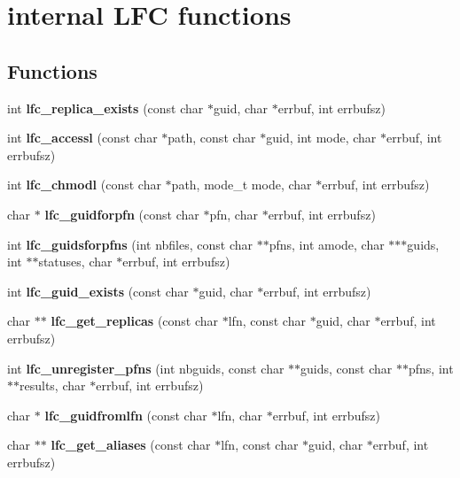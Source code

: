 \section{internal LFC functions}
\label{group__lfc__low__group}
\subsection*{Functions}
\begin{DoxyCompactItemize}
\item 
int {\bfseries lfc\_\-replica\_\-exists} (const char $\ast$guid, char $\ast$errbuf, int errbufsz)\label{group__lfc__low__group_gabbe18c87850e75add8cb0d61990ee0e1}

\item 
int {\bfseries lfc\_\-accessl} (const char $\ast$path, const char $\ast$guid, int mode, char $\ast$errbuf, int errbufsz)\label{group__lfc__low__group_gad7d35d7f3896696a7279ef8021df3673}

\item 
int {\bfseries lfc\_\-chmodl} (const char $\ast$path, mode\_\-t mode, char $\ast$errbuf, int errbufsz)\label{group__lfc__low__group_gaee59846916e41529d63b44915f122191}

\item 
char $\ast$ {\bf lfc\_\-guidforpfn} (const char $\ast$pfn, char $\ast$errbuf, int errbufsz)
\item 
int {\bf lfc\_\-guidsforpfns} (int nbfiles, const char $\ast$$\ast$pfns, int amode, char $\ast$$\ast$$\ast$guids, int $\ast$$\ast$statuses, char $\ast$errbuf, int errbufsz)
\item 
int {\bf lfc\_\-guid\_\-exists} (const char $\ast$guid, char $\ast$errbuf, int errbufsz)
\item 
char $\ast$$\ast$ {\bfseries lfc\_\-get\_\-replicas} (const char $\ast$lfn, const char $\ast$guid, char $\ast$errbuf, int errbufsz)\label{group__lfc__low__group_ga3c5ecef79062be724003a2260ef40b19}

\item 
int {\bf lfc\_\-unregister\_\-pfns} (int nbguids, const char $\ast$$\ast$guids, const char $\ast$$\ast$pfns, int $\ast$$\ast$results, char $\ast$errbuf, int errbufsz)
\item 
char $\ast$ {\bfseries lfc\_\-guidfromlfn} (const char $\ast$lfn, char $\ast$errbuf, int errbufsz)\label{group__lfc__low__group_ga192726c9dafad7c115e7887efe7d7580}

\item 
char $\ast$$\ast$ {\bfseries lfc\_\-get\_\-aliases} (const char $\ast$lfn, const char $\ast$guid, char $\ast$errbuf, int errbufsz)\label{group__lfc__low__group_ga2db9bc17b853d42e3a1d50617e88bcbc}


\end{DoxyCompactItemize}
